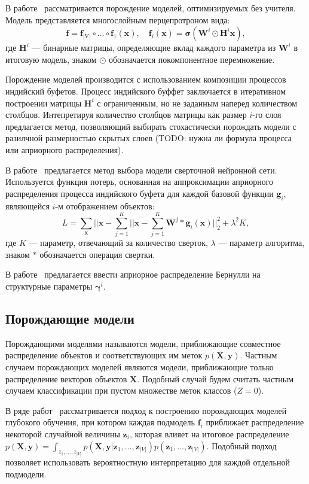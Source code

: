В работе~\cite{cib} рассматривается порождение моделей, оптимизируемых без учителя. Модель представляется многослойным перцепротроном вида:
\[
    \mathbf{f} = \mathbf{f}_\text{|V|} \circ \dots \circ \mathbf{f}_1 (\mathbf{x}), \quad \mathbf{f}_i(\mathbf{x}) = \boldsymbol{\sigma}(\mathbf{W}^i \odot \mathbf{H}^i \mathbf{x}),
\]
где $\mathbf{H}^i$ --- бинарные матрицы, определяющие вклад каждого параметра из $\mathbf{W}^i$ в итоговую модель, знаком $\odot$  обозначается покомпонентное перемножение. 

Порождение моделей производится с использованием композиции процессов индийский буфетов. Процесс индийского буффет заключается в итеративном построении матрицы $\mathbf{H}^i$ с ограниченным, но не заданным наперед количеством столбцов. Интепретируя количество столбцов  матрицы как размер $i$-го слоя предлагается метод, позволяющий выбирать стохастически порождать модели с разилчной размерностью скрытых слоев (TODO: нужна ли формула процесса или априорного распределения). 

В работе~\cite{cib_simple} предлагается метод выбора модели сверточной нейронной сети. Используется функция потерь, основанная на аппроксимации априорного распределения процесса индийского буфета для каждой базовой функции $\mathbf{g}_i$, являющейся $i$-м отображением объектов:
\[
    L = \sum_{\mathbf{x}}||\mathbf{x} - \sum_{j=1}^K ||\mathbf{x} - \sum_{j=1}^K \mathbf{W}^j * \mathbf{g}_i(\mathbf{x})||_2^2 + \lambda^2K,
\]
где $K$ --- параметр, отвечающий за количество сверток, $\lambda$ --- параметр алгоритма, знаком $*$ обозначается операция свертки.

В работе~\cite{shirakawa2018dynamic} предлагается ввести априорное распределение Бернулли на структурные параметры $\boldsymbol{\gamma}^i$.

\subsection*{Порождающие модели}
Порождающими моделями называются модели, приближающие совместное распределение объектов и соответствующих им меток $p(\mathbf{X}, \mathbf{y})$. Частным случаем порождающих моделей являются модели, приближающие только распределение векторов объектов $\mathbf{X}$. Подобный случай будем считать частным случаем классификации при пустом множестве меток классов ($Z=0$).

В ряде работ~\cite{vae_graph,vae_stick,vae_mix,var_boost,layerwise_optimal} рассматривается подход к построению порождающих моделей глубокого обучения, при котором каждая подмодель $\mathbf{f}_i$ приближает распределение некоторой случайной величины $\mathbf{z}_i$, которая влияет на итоговое распределение $p(\mathbf{X}, \mathbf{y}) = \int_{z_1, \dots, z_{|V|}} p(\mathbf{X}, \mathbf{y}|\mathbf{z}_1, \dots, \mathbf{z}_{|V|})p(\mathbf{z}_1, \dots, \mathbf{z}_{|V|}).$ Подобный подход позволяет использовать вероятностную интерпретацию для каждой отдельной подмодели. 

